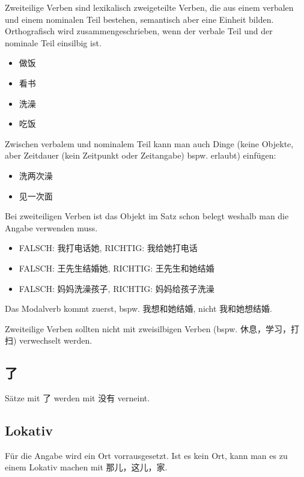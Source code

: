\documentclass[UTF8]{ctexart}
\begin{document}
Zweiteilige Verben sind lexikalisch zweigeteilte Verben, die aus einem verbalen und einem nominalen Teil bestehen, semantisch aber eine Einheit bilden. Orthografisch wird zusammengeschrieben, wenn der verbale Teil und der nominale Teil
einsilbig ist.

\begin{itemize}
    \item 做饭
    \item 看书
    \item 洗澡
    \item 吃饭
\end{itemize}

Zwischen verbalem und nominalem Teil kann man auch Dinge (keine Objekte, aber Zeitdauer (kein Zeitpunkt oder Zeitangabe) bspw. erlaubt) einfügen:

\begin{itemize}
    \item 洗两次澡
    \item 见一次面
\end{itemize}

Bei zweiteiligen Verben ist das Objekt im Satz schon belegt weshalb man die Angabe verwenden muss.

\begin{itemize}
    \item FALSCH: 我打电话她, RICHTIG: 我给她打电话
    \item FALSCH: 王先⽣结婚她, RICHTIG: 王先⽣和她结婚
    \item FALSCH: 妈妈洗澡孩⼦, RICHTIG: 妈妈给孩⼦洗澡
\end{itemize}

Das Modalverb kommt zuerst, bspw. 我想和她结婚, nicht 我和她想结婚.

Zweiteilige Verben sollten nicht mit zweisilbigen Verben (bspw. 休息，学习，打扫) verwechselt werden.

\subsection{了}

Sätze mit 了 werden mit 没有 verneint.

\subsection{Lokativ}

Für die Angabe wird ein Ort vorrausgesetzt. Ist es kein Ort, kann man es zu einem Lokativ machen mit 那儿，这儿，家.
\end{document}
